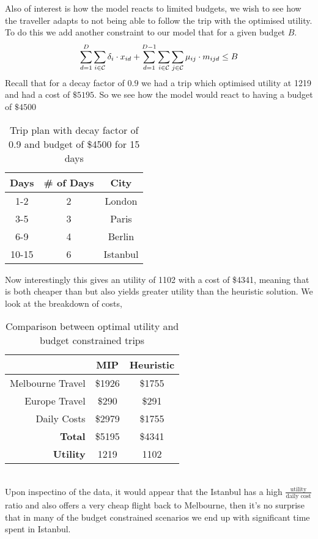 \documentclass[12pt]{article}
\begin{document}
Also of interest is how the model reacts to limited budgets, we wish to see how the traveller adapts to not being able to follow the trip with the optimised utility. To do this we add another constraint to our model that for a given budget $B$.
\begin{equation*}
	\sum_{d=1}^{D} \sum_{i \in \mathcal{C}} \delta_{i} \cdot x_{id} + \sum_{d=1}^{D-1} \sum_{i \in \mathcal{C}} \sum_{j \in \mathcal{C}} \mu_{ij} \cdot m_{ijd} \leq B\\
\end{equation*}
Recall that for a decay factor of $0.9$ we had a trip which optimised utility at 1219 and had a cost of $\$5195$. So we see how the model would react to having a budget of $\$4500$
\begin{table}[h]
\caption{Trip plan with decay factor of 0.9 and budget of \$4500 for 15 days}
\centering
\begin{tabular}{c|c|c}
	\hline
	\rule{0pt}{2ex} Days & \# of Days & City \\
	\hline
	1-2 & 2 & London \\
	3-5 & 3 & Paris \\
	6-9 & 4 & Berlin \\
	10-15 & 6 & Istanbul \\
	\hline
\end{tabular}
\vspace{1mm}
\end{table}
Now interestingly this gives an utility of 1102 with a cost of \$4341, meaning that is both cheaper than but also yields greater utility than the heuristic solution. We look at the breakdown of costs,
\begin{table}[h]
\caption{Comparison between optimal utility and budget constrained trips}
\centering
\begin{tabular}{r|c|c}
\hline
& MIP & Heuristic \\
\hline
Melbourne Travel & \$1926 & \$1755 \\
Europe Travel & \$290 & \$291 \\
Daily Costs & \$2979 & \$1755 \\
\hline
\hline
\textbf{Total} & \$5195 & \$4341 \\
\hline
\textbf{Utility} & 1219 & 1102 \\
\hline
\end{tabular}
\end{table} \\
Upon inspectino of the data, it would appear that the Istanbul has a high $\frac{\text{utility}}{\text{daily cost}}$ ratio and also offers a very cheap flight back to Melbourne, then it's no surprise that in many of the budget constrained scenarios we end up with significant time spent in Istanbul.
\end{document}
